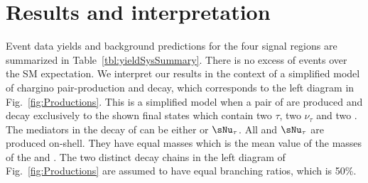 \section{Results and interpretation}
\label{sect:stat}
Event data yields and background predictions for the four signal regions are summarized in Table~\ref{tbl:yieldSysSummary}.
There is no excess of events over the SM expectation.  We interpret our results in the context
of a simplified model of chargino pair-production and decay, which corresponds to the left
diagram in Fig.~\ref{fig:Productions}. This is a simplified model when a pair of \chione 
are produced and decay exclusively to the shown final states which contain two $\tau$, two $\nu_{\tau}$ and two \PSGczDo.
The mediators in the decay of \chione can be either \sTau or $\sNu_{\tau}$. All  \sTau and $\sNu_{\tau}$ 
are produced  on-shell. They have equal masses which is the mean value of the masses of the \chione   and \PSGczDo.
The two distinct decay chains in the left diagram of Fig.~\ref{fig:Productions} are assumed to have equal branching ratios, which is 50\%.




